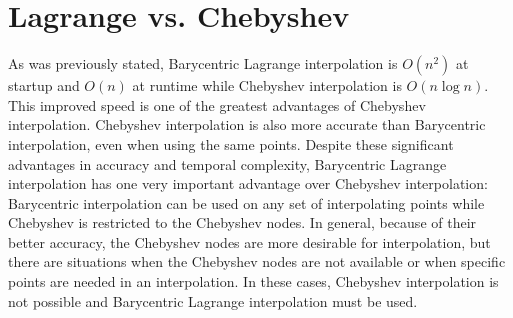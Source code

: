 \section*{Lagrange vs. Chebyshev}

As was previously stated, Barycentric Lagrange interpolation is $O(n^2)$ at startup and $O(n)$ at runtime while Chebyshev interpolation is $O(n\log n)$.
This improved speed is one of the greatest advantages of Chebyshev interpolation.
Chebyshev interpolation is also more accurate than Barycentric interpolation, even when using the same points.
Despite these significant advantages in accuracy and temporal complexity, Barycentric Lagrange interpolation has one very important advantage over Chebyshev interpolation: Barycentric interpolation can be used on any set of interpolating points while Chebyshev is restricted to the Chebyshev nodes.
In general, because of their better accuracy, the Chebyshev nodes are more desirable for interpolation, but there are situations when the Chebyshev nodes are not available or when specific points are needed in an interpolation.
In these cases, Chebyshev interpolation is not possible and Barycentric Lagrange interpolation must be used.

